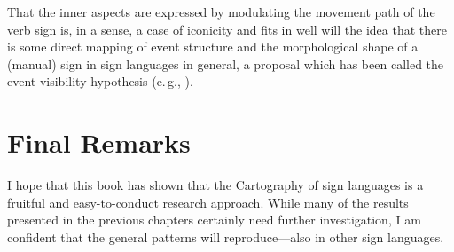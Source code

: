 That the inner aspects are expressed by modulating the movement path of the verb sign is, in a sense, a case of iconicity and fits in well will the idea that there is some direct mapping of event structure and the morphological shape of a (manual) sign in sign languages in general, a proposal which has been called the event visibility hypothesis (e.\,g., \citealt{wilbur2004event, wilbur2008complex, grose2007events}).





\section{Final Remarks}
I hope that this book has shown that the Cartography of sign languages is a fruitful and easy-to-conduct research approach. While many of the results presented in the previous chapters certainly need further investigation, I am confident that the general patterns will reproduce---also in other sign languages. 



